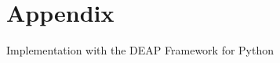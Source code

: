 \newpage
\section{Appendix}

Implementation with the DEAP Framework for Python \cite{DeRainville:2012}
